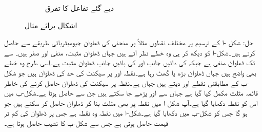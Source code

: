 \begin{figure}
\begin{subfigure}{0.5\textwidth}
\caption{دیے گئے تفاعل کا تفرق }
\label{}
\end{subfigure}%
\caption{اشکال برائے مثال }
\label{شکل_مثال_تفرق_ہموار_منحنی_الف}
\end{figure}

حل:\quad
شکل -ا کے ترسیم پر مختلف نقطوں مثلاً  پر منحنی کی ڈھلوان جیومیٹریائی طریقے سے حاصل کرتے ہیں۔شکل-ا کو دیکھ کر ہی وہ خطے نظر آتے ہیں جہاں ڈھلوان مثبت، منفی اور صفر ہیں۔  سے  تک ڈھلوان منفی ہے جبکہ   کی دائیں جانب اور  کی بائیں جانب  ڈھلوان مثبت ہے۔اسی طرح وہ خطے بھی واضح ہیں جہاں ڈھلوان بڑھ یا گھٹ رہا ہے۔نقطہ  اور  پر سیکنٹ کی حد کی ڈھلوان  ہیں جو شکل -ب کے مطابقتی نقطے  اور  دیتے ہیں جہاں  ہے۔نقطہ  پر سیکنٹ کی ڈھلوان حاصل کرنے کی خاطر قائمہ مثلث مکمل کیا گیا ہے جہاں سے  اور  پڑھے جا سکتے ہیں جن سے  حاصل ہوتا ہے۔شکل-ب میں اس کو نقطہ  دکھایا گیا ہے۔آپ شکل-ا میں نقطہ  پر بھی مثلث بنا کر ڈھلوان حاصل کر سکتے ہیں جو  ہو گا جس کو شکل-ب میں  دکھایا گیا ہے۔شکل-ا میں نقطہ  وہ نقطہ ہے جس پر ڈھلوان کی کم تر قیمت حاصل ہوتی ہے جس سے شکل-ب کا نشیب  حاصل ہوتا ہے۔  

